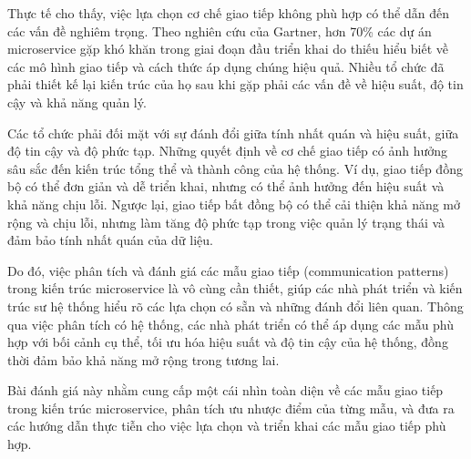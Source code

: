 Thực tế cho thấy, việc lựa chọn cơ chế giao tiếp không phù hợp có thể dẫn đến
các vấn đề nghiêm trọng. Theo nghiên cứu của Gartner, hơn 70\% các dự án
microservice gặp khó khăn trong giai đoạn đầu triển khai do thiếu hiểu biết về
các mô hình giao tiếp và cách thức áp dụng chúng hiệu quả. Nhiều tổ chức đã
phải thiết kế lại kiến trúc của họ sau khi gặp phải các vấn đề về hiệu suất, độ
tin cậy và khả năng quản lý.

Các tổ chức phải đối mặt với sự đánh đổi giữa tính nhất quán và hiệu suất, giữa
độ tin cậy và độ phức tạp. Những quyết định về cơ chế giao tiếp có ảnh hưởng
sâu sắc đến kiến trúc tổng thể và thành công của hệ thống. Ví dụ, giao tiếp
đồng bộ có thể đơn giản và dễ triển khai, nhưng có thể ảnh hưởng đến hiệu suất
và khả năng chịu lỗi. Ngược lại, giao tiếp bất đồng bộ có thể cải thiện khả
năng mở rộng và chịu lỗi, nhưng làm tăng độ phức tạp trong việc quản lý trạng
thái và đảm bảo tính nhất quán của dữ liệu.

Do đó, việc phân tích và đánh giá các mẫu giao tiếp (communication patterns)
trong kiến trúc microservice là vô cùng cần thiết, giúp các nhà phát triển và
kiến trúc sư hệ thống hiểu rõ các lựa chọn có sẵn và những đánh đổi liên quan.
Thông qua việc phân tích có hệ thống, các nhà phát triển có thể áp dụng các mẫu
phù hợp với bối cảnh cụ thể, tối ưu hóa hiệu suất và độ tin cậy của hệ thống,
đồng thời đảm bảo khả năng mở rộng trong tương lai.

Bài đánh giá này nhằm cung cấp một cái nhìn toàn diện về các mẫu giao tiếp
trong kiến trúc microservice, phân tích ưu nhược điểm của từng mẫu, và đưa ra
các hướng dẫn thực tiễn cho việc lựa chọn và triển khai các mẫu giao tiếp phù
hợp.
